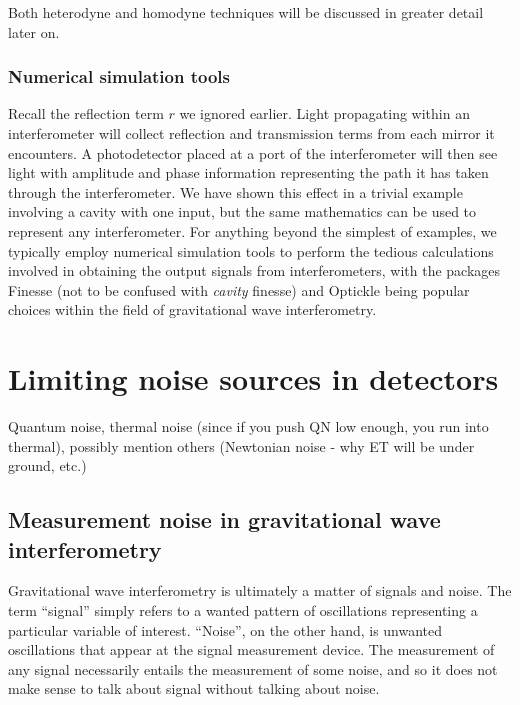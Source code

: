 Both heterodyne and homodyne techniques will be discussed in greater detail later on.



\subsubsection{Numerical simulation tools}
Recall the reflection term $r$ we ignored earlier. Light propagating within an interferometer will collect reflection and transmission terms from each mirror it encounters. A photodetector placed at a port of the interferometer will then see light with amplitude and phase information representing the path it has taken through the interferometer. We have shown this effect in a trivial example involving a \FP{} cavity with one input, but the same mathematics can be used to represent any interferometer. For anything beyond the simplest of examples, we typically employ numerical simulation tools to perform the tedious calculations involved in obtaining the output signals from interferometers, with the packages Finesse \cite{Freise2004} (not to be confused with \emph{cavity} finesse) and Optickle \cite{Evans2012} being popular choices within the field of gravitational wave interferometry.

\section{Limiting noise sources in detectors}
Quantum noise, thermal noise (since if you push QN low enough, you run into thermal), possibly mention others (Newtonian noise - why ET will be under ground, etc.)

\subsection{Measurement noise in gravitational wave interferometry}
Gravitational wave interferometry is ultimately a matter of signals and noise. The term ``signal'' simply refers to a wanted pattern of oscillations representing a particular variable of interest. ``Noise'', on the other hand, is unwanted oscillations that appear at the signal measurement device. The measurement of any signal necessarily entails the measurement of some noise, and so it does not make sense to talk about signal without talking about noise.

